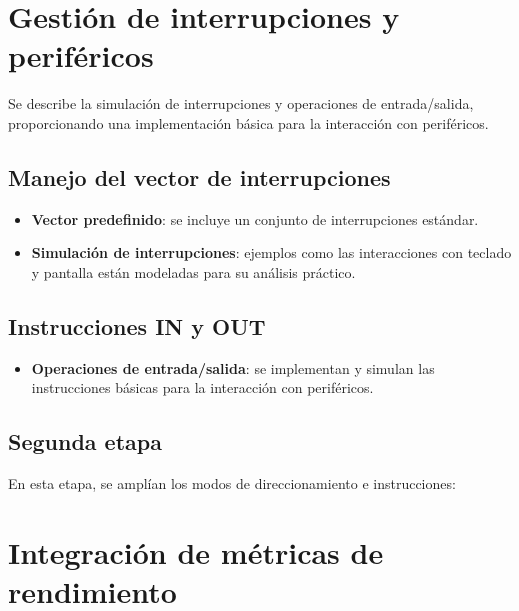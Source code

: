 \documentclass[12pt,oneside]{templates/unerthesis}
\providecommand{\tightlist}{%
  \setlength{\itemsep}{0pt}\setlength{\parskip}{0pt}}
\begin{document}
\hypertarget{gestiuxf3n-de-interrupciones-y-perifuxe9ricos}{%
\section{Gestión de interrupciones y periféricos}\label{gestiuxf3n-de-interrupciones-y-perifuxe9ricos}}

Se describe la simulación de interrupciones y operaciones de entrada/salida, proporcionando una implementación básica para la interacción con periféricos.

\hypertarget{manejo-del-vector-de-interrupciones}{%
\subsection{Manejo del vector de interrupciones}\label{manejo-del-vector-de-interrupciones}}

\begin{itemize}
\tightlist
\item
  \textbf{Vector predefinido}: se incluye un conjunto de interrupciones estándar.
\item
  \textbf{Simulación de interrupciones}: ejemplos como las interacciones con teclado y pantalla están modeladas para su análisis práctico.
\end{itemize}

\hypertarget{instrucciones-in-y-out}{%
\subsection{Instrucciones IN y OUT}\label{instrucciones-in-y-out}}

\begin{itemize}
\tightlist
\item
  \textbf{Operaciones de entrada/salida}: se implementan y simulan las instrucciones básicas para la interacción con periféricos.
\end{itemize}

\hypertarget{segunda-etapa}{%
\subsection{Segunda etapa}\label{segunda-etapa}}

En esta etapa, se amplían los modos de direccionamiento e instrucciones:

\hypertarget{integraciuxf3n-de-muxe9tricas-de-rendimiento}{%
\section{Integración de métricas de rendimiento}\label{integraciuxf3n-de-muxe9tricas-de-rendimiento}}
\end{document}

